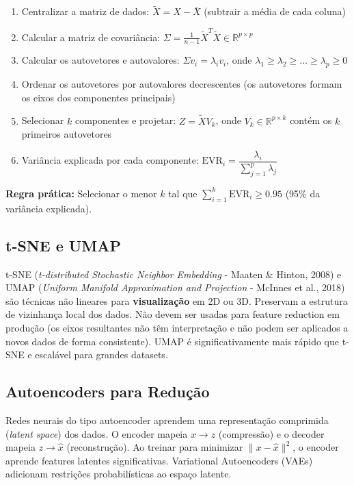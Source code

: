 \documentclass[12pt,a4paper]{article}
\begin{document}
\begin{enumerate}[leftmargin=*, label=\textbf{Passo \arabic*:}]
  \item Centralizar a matriz de dados: $\tilde{X} = X - \bar{X}$ (subtrair a média de cada coluna)

  \item Calcular a matriz de covariância: $\Sigma = \frac{1}{n-1} \tilde{X}^T \tilde{X} \in \mathbb{R}^{p \times p}$

  \item Calcular os autovetores e autovalores: $\Sigma v_i = \lambda_i v_i$, onde $\lambda_1 \geq \lambda_2 \geq \ldots \geq \lambda_p \geq 0$

  \item Ordenar os autovetores por autovalores decrescentes (os autovetores formam os eixos dos componentes principais)

  \item Selecionar $k$ componentes e projetar: $Z = \tilde{X} V_k$, onde $V_k \in \mathbb{R}^{p \times k}$ contém os $k$ primeiros autovetores

  \item Variância explicada por cada componente: $\text{EVR}_i = \dfrac{\lambda_i}{\sum_{j=1}^{p} \lambda_j}$
\end{enumerate}

\textbf{Regra prática:} Selecionar o menor $k$ tal que $\sum_{i=1}^{k} \text{EVR}_i \geq 0.95$ (95\% da variância explicada).

\subsection{t-SNE e UMAP}

t-SNE (\textit{t-distributed Stochastic Neighbor Embedding} - Maaten \& Hinton, 2008) e UMAP (\textit{Uniform Manifold Approximation and Projection} - McInnes et al., 2018) são técnicas não lineares para \textbf{visualização} em 2D ou 3D. Preservam a estrutura de vizinhança local dos dados. Não devem ser usadas para feature reduction em produção (os eixos resultantes não têm interpretação e não podem ser aplicados a novos dados de forma consistente). UMAP é significativamente mais rápido que t-SNE e escalável para grandes datasets.

\subsection{Autoencoders para Redução}

Redes neurais do tipo autoencoder aprendem uma representação comprimida (\textit{latent space}) dos dados. O encoder mapeia $x \rightarrow z$ (compressão) e o decoder mapeia $z \rightarrow \hat{x}$ (reconstrução). Ao treinar para minimizar $\|x - \hat{x}\|^2$, o encoder aprende features latentes significativas. Variational Autoencoders (VAEs) adicionam restrições probabilísticas ao espaço latente.
\end{document}
